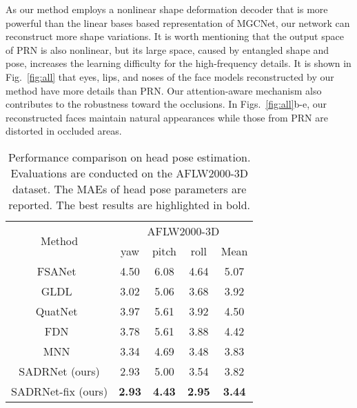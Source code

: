 \documentclass[journal]{IEEEtran}
\begin{document}
	
	As our method employs a nonlinear shape deformation decoder that is more powerful than the linear bases based representation of MGCNet, our network can reconstruct more shape variations. It is worth mentioning that the output space of PRN is also nonlinear, but its large space, caused by entangled shape and pose, increases the learning difficulty for the high-frequency details. It is shown in Fig.~\ref{fig:all} that eyes, lips, and noses of the face models reconstructed by our method have more details than PRN. Our attention-aware mechanism also contributes to the robustness toward the occlusions. In Figs.~\ref{fig:all}b-e, our reconstructed faces maintain natural appearances while those from PRN are distorted in occluded areas.
	
	
	
	\begin{table}[tbp]
		\caption{Performance comparison on head pose estimation. Evaluations are conducted on the AFLW2000-3D dataset. The MAEs of head pose parameters are reported. The best results are highlighted in bold.}
		\begin{center}
			\begin{tabular}{|c|c|c|c|c|}
				\hline
				\multirow{2}{*}{Method} &         \multicolumn{4}{c|}{AFLW2000-3D}         \\ \cline{2-5}
				&    yaw     &   pitch    &   roll    &    Mean    \\ \hline
				FSANet~\cite{FSA}    &    4.50    &    6.08    &   4.64    &    5.07    \\
				GLDL~\cite{GLDL}     &    3.02    &    5.06    &   3.68    &    3.92    \\
				QuatNet~\cite{Quatnet}  &    3.97    &    5.61    &   3.92    &    4.50    \\
				FDN~\cite{FDN}      &    3.78    &    5.61    &   3.88    &    4.42    \\
				MNN~\cite{MNN}      &    3.34    &    4.69    &   3.48    &    3.83    \\ \hline
				SADRNet (ours)      &    2.93    &    5.00    &   3.54    &    3.82    \\
				SADRNet-fix (ours)    & {\bf 2.93} & {\bf 4.43} & {\bf2.95} & {\bf 3.44} \\ \hline
			\end{tabular}
			
		\end{center}
		\label{tab:pose estimation}
	\end{table}
	
	
	
\end{document}

